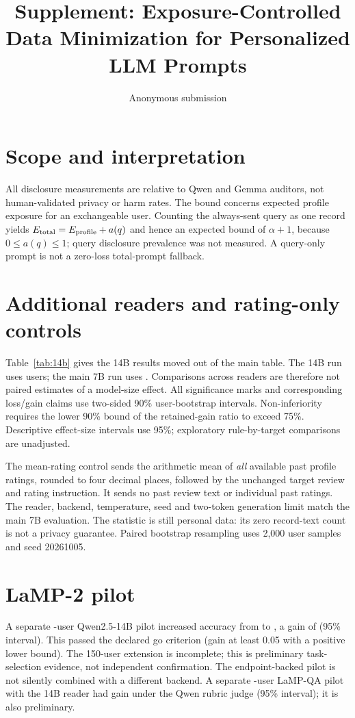 \documentclass[10pt]{article}
\title{Supplement: Exposure-Controlled Data Minimization for Personalized LLM Prompts}
\author{Anonymous submission}
\date{}
\begin{document}
\maketitle
\section{Scope and interpretation}
All disclosure measurements are relative to Qwen and Gemma auditors, not
human-validated privacy or harm rates. The bound concerns expected profile
exposure for an exchangeable user. Counting the always-sent query as one
record yields $E_{\rm total}=E_{\rm profile}+a(q)$ and hence an expected
bound of $\alpha+1$, because $0\leq a(q)\leq1$; query disclosure prevalence
was not measured. A query-only prompt is not a zero-loss total-prompt fallback.

\section{Additional readers and rating-only controls}
Table~\ref{tab:14b} gives the 14B results moved out of the main table.
The 14B run uses \FourteenN{} users; the main 7B run uses \threeNReader{}. Comparisons across
readers are therefore not paired estimates of a model-size effect.
All significance marks and corresponding loss/gain claims use two-sided
90\% user-bootstrap intervals. Non-inferiority requires the lower 90\%
bound of the retained-gain ratio to exceed 75\%. Descriptive effect-size
intervals use 95\%; exploratory rule-by-target comparisons are unadjusted.
\begin{table}[ht]
\centering\small
\caption{LaMP-3 with Qwen2.5-14B: exposure, admitted records and utility.
Marks have the same definitions as Table 1 of the paper.}
\label{tab:14b}

\end{table}

The mean-rating control sends the arithmetic mean of \emph{all} available
past profile ratings, rounded to four decimal places, followed by the
unchanged target review and rating instruction. It sends no past review
text or individual past ratings. The reader, backend, temperature, seed
and two-token generation limit match the main 7B evaluation. The statistic
is still personal data: its zero record-text count is not a privacy guarantee.
Paired bootstrap resampling uses 2,000 user samples and seed 20261005.


\section{LaMP-2 pilot}
A separate \twoPilotN{}-user Qwen2.5-14B pilot increased accuracy from \twoPilotNone{} to \twoPilotTop{},
a gain of \twoPilotGain{} (95\% interval). This passed the declared
go criterion (gain at least 0.05 with a positive lower bound). The 150-user
extension is incomplete; this is preliminary task-selection evidence,
not independent confirmation. The endpoint-backed pilot is not silently
combined with a different backend. A separate \qaPilotN{}-user LaMP-QA
pilot with the 14B reader had gain \qaPilotGain{} under the Qwen rubric judge
(95\% interval); it is also preliminary.
\end{document}

